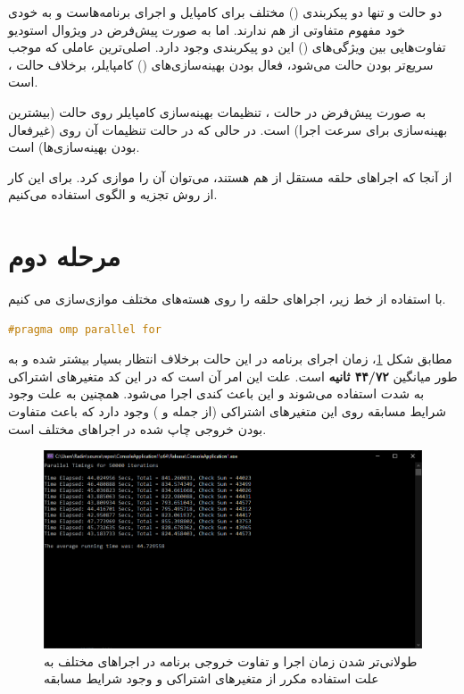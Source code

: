 \documentclass{HW}
\begin{document}
\begin{question}
دو حالت  و  تنها دو پیکربندی () مختلف برای کامپایل و اجرای برنامه‌هاست و به خودی خود مفهوم متفاوتی از هم ندارند. اما به صورت پیش‌فرض در ویژوال استودیو تفاوت‌هایی بین ویژگی‌های () این دو پیکربندی وجود دارد. اصلی‌ترین عاملی که موجب سریع‌تر بودن حالت  می‌شود، فعال بودن بهینه‌سازی‌های () کامپایلر، برخلاف حالت ، است.

به صورت پیش‌فرض در حالت ، تنظیمات بهینه‌سازی کامپایلر روی حالت  (بیشترین بهینه‌سازی برای سرعت اجرا) است. در حالی که در حالت  تنظیمات آن روی  (غیرفعال بودن بهینه‌سازی‌ها) است.
\end{question}

\begin{question}
از آنجا که اجراهای حلقه  مستقل از هم هستند، می‌توان آن را موازی کرد. برای این کار از روش تجزیه  و الگوی  استفاده می‌کنیم.
\end{question}

\section{مرحله دوم}

با استفاده از خط زیر، اجراهای حلقه  را روی هسته‌های مختلف موازی‌سازی می کنیم.
\begin{latin}
\begin{lstlisting}[language=C]
#pragma omp parallel for
\end{lstlisting}
\end{latin}
مطابق شکل
\ref{fig:parallel-for}،
زمان اجرای برنامه در این حالت برخلاف انتظار بسیار بیشتر شده و به طور میانگین \textbf{۴۴/۷۲ ثانیه} است. علت این امر آن است که در این کد متغیرهای اشتراکی به شدت استفاده می‌شوند و این باعث کندی اجرا می‌شود. همچنین به علت وجود شرایط مسابقه روی این متغیرهای اشتراکی (از جمله  و ) وجود دارد که باعث متفاوت بودن خروجی چاپ شده در 
اجراهای مختلف است.

\begin{figure}[ht!]
\begin{center}
	\includegraphics[width=15cm]{images/parallel-for}
\end{center}
\caption{طولانی‌تر شدن زمان اجرا و تفاوت خروجی برنامه در اجراهای مختلف به علت استفاده مکرر از متغیرهای اشتراکی و وجود شرایط مسابقه}
\label{fig:parallel-for}
\end{figure}
\end{document}
